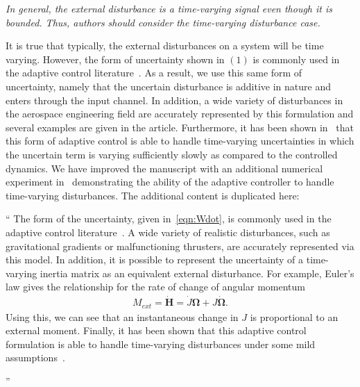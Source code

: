 \documentclass[11pt]{article}
\newcommand{\vecbf}[1]{\bm{#1}}
\newenvironment{correction}{\begin{list}{}{\setlength{\leftmargin}{1cm}\setlength{\rightmargin}{1cm}}\vspace{\parsep}\item[]``}{''\end{list}}
\begin{document}
\begin{enumerate}

\item \textit{ In general, the external disturbance is a time-varying signal even though it is bounded. Thus, authors should consider the time-varying disturbance case.}

It is true that typically, the external disturbances on a system will be time varying.
However, the form of uncertainty shown in \( (1) \) is commonly used in the adaptive control literature~\cite{lee2013b,ioannou2012}.
As a result, we use this same form of uncertainty, namely that the uncertain disturbance is additive in nature and enters through the input channel.
In addition, a wide variety of disturbances in the aerospace engineering field are accurately represented by this formulation and several examples are given in the article.
Furthermore, it has been shown in~\cite{ioannou2012} that this form of adaptive control is able to handle time-varying uncertainties in which the uncertain term is varying sufficiently slowly as compared to the controlled dynamics. 
We have improved the manuscript with an additional numerical experiment in~ demonstrating the ability of the adaptive controller to handle time-varying disturbances.
The additional content is duplicated here:
\begin{correction}
    The form of the uncertainty, given in~\cref{eqn:Wdot}, is commonly used in the adaptive control literature~\cite{lee2013b,ioannou2012}. 
    A wide variety of realistic disturbances, such as gravitational gradients or malfunctioning thrusters, are accurately represented via this model. 
    In addition, it is possible to represent the uncertainty of a time-varying inertia matrix as an equivalent external disturbance. 
    For example, Euler's law gives the relationship for the rate of change of angular momentum
    \begin{align*}
        M_{ext} = \dot{\vecbf{H}} = \dot{J} \vecbf{\Omega} + J \dot{\vecbf{\Omega}} .
    \end{align*}
    Using this, we can see that an instantaneous change in \( J \) is proportional to an external moment.
    Finally, it has been shown that this adaptive control formulation is able to handle time-varying disturbances under some mild assumptions~\cite{ioannou2012}. 


\end{correction}
\end{enumerate}
\end{document}
